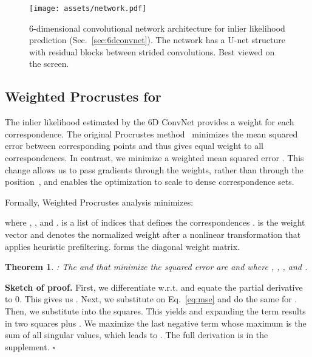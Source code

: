 \documentclass[10pt,twocolumn,letterpaper]{article}
\newtheorem{theorem}{Theorem}
\begin{document}
\begin{figure}
\centering
\small
\texttt{[image: assets/network.pdf]}
\caption{6-dimensional convolutional network architecture for inlier likelihood prediction (Sec.~\ref{sec:6dconvnet}). The network has a U-net structure with residual blocks between strided convolutions. Best viewed on the screen.}
\label{fig:network}  
\end{figure}








\subsection{Weighted Procrustes for }
\label{sec:weighted_procrustes}

The inlier likelihood estimated by the 6D ConvNet provides a weight for each correspondence.
The original Procrustes method~\cite{gower1975generalized} minimizes the mean squared error between corresponding points  and thus gives equal weight to all correspondences. In contrast, we minimize a weighted mean squared error .
This change allows us to pass gradients through the weights, rather than through the position~\cite{wang2019deep}, and enables the optimization to scale to dense correspondence sets.





Formally, Weighted Procrustes analysis minimizes:

where , , and .
 is a list of indices that defines the correspondences . 
 is the weight vector and  denotes the normalized weight after a nonlinear transformation  that applies heuristic prefiltering.  forms the diagonal weight matrix.

\begin{theorem}: The  and  that minimize the squared error  are  and  where , , , and .
\end{theorem}
\textbf{Sketch of proof.} First, we differentiate  w.r.t.  and equate the partial derivative to 0. This gives us . Next, we substitute  on Eq.~\ref{eq:mse} and do the same for . Then, we substitute  into the squares. This yields  and expanding the term results in two squares plus . We maximize the last negative term whose maximum is the sum of all singular values, which leads to . The full derivation is in the supplement. \hfill\ensuremath{\square}
\vspace{0.5em}
\end{document}
